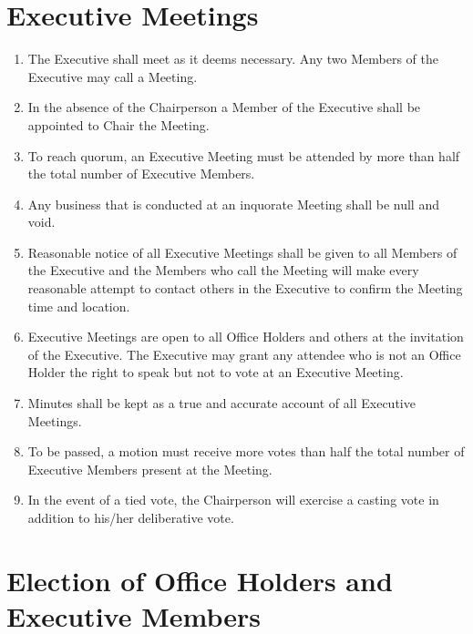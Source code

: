 \documentclass[a4paper]{article}
\begin{document}
	\section{Executive Meetings}
	
	\begin{enumerate}
		\item The Executive shall meet as it deems necessary. Any two Members of the Executive may call a Meeting.
		
		\item In the absence of the Chairperson a Member of the Executive shall be appointed to Chair the Meeting.
		
		\item To reach quorum, an Executive Meeting must be attended by more than half the total number of Executive Members.
		
		\item Any business that is conducted at an inquorate Meeting shall be null and void.
		
		\item Reasonable notice of all Executive Meetings shall be given to all Members of the Executive and the Members who call the Meeting will make every reasonable attempt to contact others in the Executive to confirm the Meeting time and location.
		
		\item Executive Meetings are open to all Office Holders and others at the invitation of the Executive.
		The Executive may grant any attendee who is not an Office Holder the right to speak but not to vote at an Executive Meeting.
		
		\item Minutes shall be kept as a true and accurate account of all Executive Meetings.
		
		\item To be passed, a motion must receive more votes than half the total number of Executive Members present at the Meeting.
		
		\item In the event of a tied vote, the Chairperson will exercise a casting vote in addition to his/her deliberative vote.

	\end{enumerate}
	
	\section{Election of Office Holders and Executive Members}
	
\end{document}

